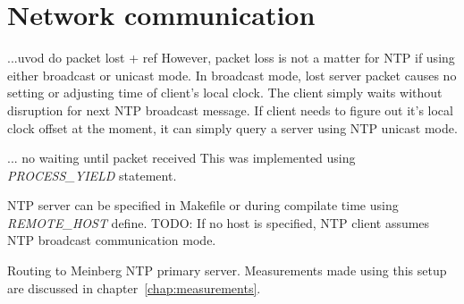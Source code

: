 
\section{Network communication}
...uvod do packet lost + ref
However, packet loss is not a matter for NTP if using either broadcast or unicast mode.
In broadcast mode, lost server packet causes no setting or adjusting time of client's
local clock.
The client simply waits without disruption for next NTP broadcast message.
If client needs to figure out it's local clock offset at the moment,
it can simply query a server using NTP unicast mode.

... no waiting until packet received
This was implemented using {\it{PROCESS\_YIELD}} statement.

NTP server can be specified in Makefile or
during compilate time using {\it{REMOTE\_HOST}} define.
TODO: If no host is specified,
NTP client assumes NTP broadcast communication mode.

Routing to Meinberg NTP primary server.
Measurements made using this setup are discussed in chapter~\ref{chap:measurements}.
